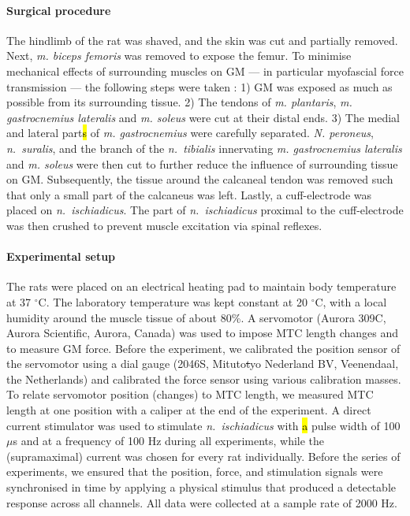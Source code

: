 \documentclass[
  10pt,
  letterpaper,
]{article}
\begin{document}
\paragraph{Surgical procedure}\label{surgical-procedure}

The hindlimb of the rat was shaved, and the skin was cut and partially
removed. Next, \emph{m. biceps femoris} was removed to expose the femur.
To minimise mechanical effects of surrounding muscles on GM --- in
particular myofascial force transmission --- the following steps were
taken \citep[see][]{rijkelijkhuizen_extramuscular_2005}: 1) GM was
exposed as much as possible from its surrounding tissue. 2) The tendons
of \emph{m. plantaris}, \emph{m. gastrocnemius lateralis} and \emph{m.
soleus} were cut at their distal ends. 3) The medial and lateral
part\hl{s} of \emph{m. gastrocnemius} were carefully separated. \emph{N.
peroneus}, \emph{n.~suralis}, and the branch of the \emph{n.~tibialis}
innervating \emph{m. gastrocnemius lateralis} and \emph{m. soleus} were
then cut to further reduce the influence of surrounding tissue on GM.
Subsequently, the tissue around the calcaneal tendon was removed such
that only a small part of the calcaneus was left. Lastly, a
cuff-electrode was placed on \emph{n.~ischiadicus}. The part of
\emph{n.~ischiadicus} proximal to the cuff-electrode was then crushed to
prevent muscle excitation via spinal reflexes.

\paragraph{Experimental setup}\label{experimental-setup}

The rats were placed on an electrical heating pad to maintain body
temperature at 37 \(^{\circ}\)C. The laboratory temperature was kept
constant at 20 \(^{\circ}\)C, with a local humidity around the muscle
tissue of about 80\%. A servomotor (Aurora 309C, Aurora Scientific,
Aurora, Canada) was used to impose MTC length changes and to measure GM
force. Before the experiment, we calibrated the position sensor of the
servomotor using a dial gauge (2046S, Mituto\st{t}yo Nederland BV,
Veenendaal, the Netherlands) and calibrated the force sensor using
various calibration masses. To relate servomotor position (changes) to
MTC length, we measured MTC length at one position with a caliper at the
end of the experiment. A direct current stimulator was used to stimulate
\emph{n.~ischiadicus} with \hl{a} pulse width of 100 \(\mu\)s and at a
frequency of 100 Hz during all experiments, while the (supramaximal)
current was chosen for every rat individually. Before the series of
experiments, we ensured that the position, force, and stimulation
signals were synchronised in time by applying a physical stimulus that
produced a detectable response across all channels. All data were
collected at a sample rate of 2000 Hz.
\end{document}
